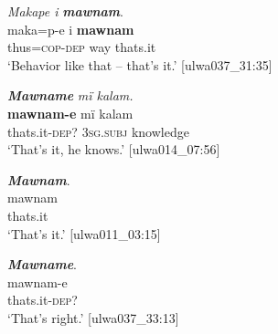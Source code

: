 \ea%
    \label{ex:otherwc:155}
          \textit{Makape i} \textbf{\textit{mawnam}}.\\
\gll maka=p-e    i    \textbf{mawnam}\\
    thus=\textsc{cop-dep}  way  thats.it\\
\glt `Behavior like that -- that’s it.’ [ulwa037\_31:35]
\z

\ea%
    \label{ex:otherwc:156}
          \textbf{\textit{Mawname}} \textit{mï kalam.}\\
\gll    \textbf{mawnam-e}  mï      kalam\\
    thats.it-\textsc{dep?}  \textsc{3sg.subj}  knowledge\\
\glt `That’s it, he knows.’ [ulwa014\_07:56]
\z

\ea%
    \label{ex:otherwc:157}
          \textbf{\textit{Mawnam}}.\\
\gll mawnam\\
    thats.it\\
\glt `That’s it.’ [ulwa011\_03:15]
\z

\ea%
    \label{ex:otherwc:158}
          \textbf{\textit{Mawname}}.\\
\gll mawnam-e\\
    thats.it-\textsc{dep?}\\
\glt `That’s right.’ [ulwa037\_33:13]
\z


